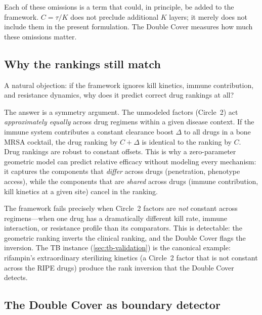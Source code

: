 \documentclass[11pt]{article}
\theoremstyle{plain}
\theoremstyle{definition}
\begin{document}
Each of these omissions is a term that could, in principle, be
added to the framework. $C = \tau / K$ does not preclude
additional $K$ layers; it merely does not include them in the
present formulation. The Double Cover measures how much these
omissions matter.

\subsection{Why the rankings still match}
\label{sec:why-rankings}

A natural objection: if the framework ignores kill kinetics, immune
contribution, and resistance dynamics, why does it predict correct
drug rankings at all?

The answer is a symmetry argument. The unmodeled factors
(Circle~2) act \emph{approximately equally} across drug regimens
within a given disease context. If the immune system contributes
a constant clearance boost $\Delta$ to all drugs in a bone MRSA
cocktail, the drug ranking by $C + \Delta$ is identical to the
ranking by $C$. Drug rankings are robust to constant offsets.
This is why a zero-parameter geometric model can predict relative
efficacy without modeling every mechanism: it captures the
components that \emph{differ} across drugs (penetration, phenotype
access), while the components that are \emph{shared} across drugs
(immune contribution, kill kinetics at a given site) cancel in the
ranking.

The framework fails precisely when Circle~2 factors are
\emph{not} constant across regimens---when one drug has a
dramatically different kill rate, immune interaction, or resistance
profile than its comparators. This is detectable: the geometric
ranking inverts the clinical ranking, and the Double Cover flags
the inversion. The TB instance (\cref{sec:tb-validation}) is the
canonical example: rifampin's extraordinary sterilizing kinetics
(a Circle~2 factor that is not constant across the RIPE drugs)
produce the rank inversion that the Double Cover detects.

\subsection{The Double Cover as boundary detector}
\label{sec:dc-boundary}
\end{document}
